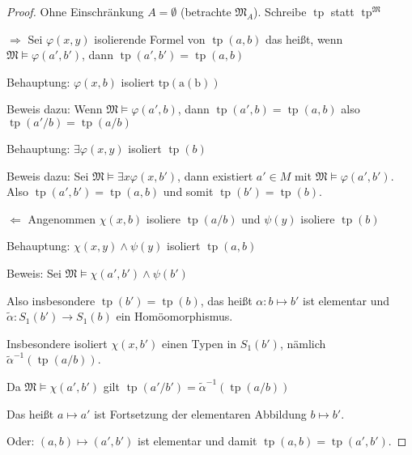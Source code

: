 \documentclass[12pt,parskip=full]{scrartcl}
\newcommand{\heading}{\underline}
\theoremstyle{definition}
\begin{document}
 	\begin{proof}
 		Ohne Einschränkung $A = \emptyset$ (betrachte $\mathfrak{M}_A$). Schreibe $\operatorname{tp}$ statt $\operatorname{tp}^\mathfrak{M}$
 		
 		\heading{$\Rightarrow$} Sei $\varphi(x,y)$ isolierende Formel von $\operatorname{tp}(a,b)$ das heißt, wenn $\mathfrak{M} \models \varphi(a',b')$, dann $\operatorname{tp}(a',b') = \operatorname{tp}(a,b)$
 		
 		Behauptung: $\varphi(x,b)$ isoliert $\operatorname{tp(a(b))}$
 		
 		Beweis dazu: Wenn $\mathfrak{M} \models \varphi(a',b)$, dann $\operatorname{tp}(a',b) = \operatorname{tp}(a,b)$ also $\operatorname{tp}(a'/b) = \operatorname{tp}(a/b)$
 		
 		Behauptung: $\exists \varphi(x,y)$ isoliert $\operatorname{tp}(b)$
 		
 		Beweis dazu: Sei $\mathfrak{M} \models \exists x \varphi(x, b')$, dann existiert $a' \in M$ mit $\mathfrak{M} \models \varphi(a',b')$. Also $\operatorname{tp}(a',b') = \operatorname{tp}(a,b)$ und somit $\operatorname{tp}(b') = \operatorname{tp}(b)$.
 		
 		\heading{$\Leftarrow$} Angenommen $\chi(x,b)$ isoliere $\operatorname{tp}(a/b)$ und $\psi(y)$ isoliere $\operatorname{tp}(b)$
 		
 		Behauptung: $\chi(x,y) \land \psi(y)$ isoliert $\operatorname{tp}(a,b)$
 		
 		Beweis: Sei $\mathfrak{M} \models \chi(a',b') \land \psi(b')$
 		
 		Also insbesondere $\operatorname{tp}(b') = \operatorname{tp}(b)$, das heißt $\alpha: b \mapsto b'$ ist elementar und $\tilde{\alpha}: S_1(b') \to S_1(b)$ ein Homöomorphismus.
 		
 		Insbesondere isoliert $\chi(x,b')$ einen Typen in $S_1(b')$, nämlich $\tilde{\alpha}^{-1}(\operatorname{tp}(a/b))$.
 		
 		Da $\mathfrak{M} \models \chi(a',b')$ gilt $\operatorname{tp}(a'/b') = \tilde{\alpha}^{-1}(\operatorname{tp}(a/b))$
 		
 		Das heißt $a \mapsto a'$ ist Fortsetzung der elementaren Abbildung $b \mapsto b'$.
 		
 		Oder: $(a,b) \mapsto (a',b')$ ist elementar und damit $\operatorname{tp}(a,b) = \operatorname{tp}(a',b')$.
 	\end{proof}
 
\end{document}
